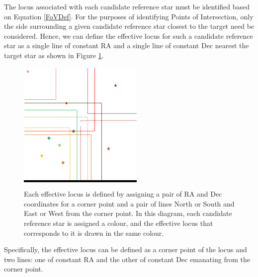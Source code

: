 \documentclass[]{elsarticle} %
\makeatletter
\def\maxwidth{\ifdim\Gin@nat@width>\linewidth\linewidth
\else\Gin@nat@width\fi}
\let\Oldincludegraphics\includegraphics
\renewcommand{\includegraphics}[1]{\Oldincludegraphics[width=\maxwidth]{#1}}
\makeatother
\begin{document}
The locus associated with each candidate reference star must be
identified based on Equation \ref{FoVDef}. For the purposes of identifying Points
of Intersection, only the side surrounding a given candidate reference
star closest to the target need be considered. Hence, we can define the
effective locus for such a candidate reference star as a single line of
constant RA and a single line of constant Dec nearest the target star
as shown in Figure \ref{effective_locus}.

\begin{figure}
\centering
\colorbox{black}{\includegraphics{fig3.png}}
\caption{\label{effective_locus}Each effective locus is defined by assigning a pair
of RA and Dec coordinates for a corner point and a pair of lines North
or South and East or West from the corner point. In this diagram, each
candidate reference star is assigned a colour, and the effective locus
that corresponds to it is drawn in the same colour.}
\end{figure}

Specifically, the effective locus can be defined as a corner point of
the locus and two lines: one of constant RA and the other of constant
Dec emanating from the corner point. 
\end{document}
